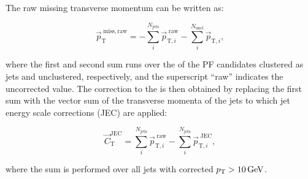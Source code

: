 The raw missing transverse momentum can be written as:

\begin{equation}
{\vec p}_\mathrm{T}^\mathrm{\; miss,raw} = - \sum_{i}^{N_\mathrm{jets}} {\vec p}_{\mathrm{T},i}^{\;\mathrm{raw}} - \sum_{i}^{N_\mathrm{uncl}} {\vec p}_{\mathrm{T},i},
\end{equation}

where the first and second sum runs over the \pt of the PF candidates clustered as jets and unclustered, respectively, and the superscript ``raw'' indicates the uncorrected value.
The correction to the \ptvecmiss is then obtained by replacing the first sum with the vector sum of the transverse momenta of the jets to which jet energy scale corrections (JEC) are applied:

\begin{equation}
{\vec C}_\mathrm{T}^\mathrm{JEC} = \sum_{i}^{N_\mathrm{jets}} {\vec p}_{\mathrm{T},i}^{\;\mathrm{raw}} - \sum_{i}^{N_\mathrm{jets}} {\vec p}_{\mathrm{T},i}^{\;\mathrm{JEC}},
\end{equation}

where the sum is performed over all jets with corrected $p_{\mathrm{T}} > 10\,\text{Ge\hspace{-.08em}V}$.

